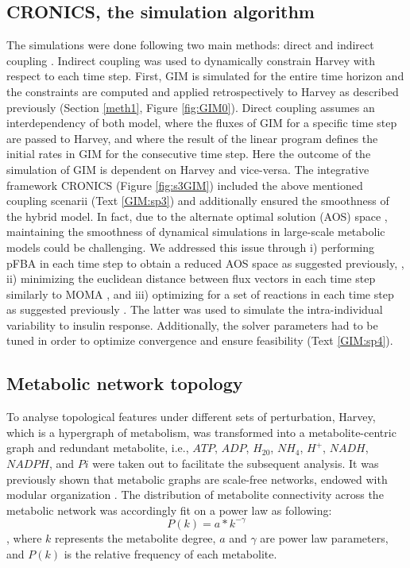 \subsection{CRONICS, the simulation algorithm}
The simulations were done following two main methods: direct and indirect coupling \cite{covert2008integrating,krauss2012integrating}. Indirect coupling was used to dynamically constrain Harvey with respect to each time step. First, GIM is simulated for the entire time horizon and the constraints are computed and applied retrospectively to Harvey as described previously (Section \ref{meth1}, Figure \ref{fig:GIM0}). Direct coupling assumes an interdependency of both model, where the fluxes of GIM for a specific time step are passed to Harvey, and where the result of the linear program defines the initial rates in GIM for the consecutive time step. Here the outcome of the simulation of GIM is dependent on Harvey and vice-versa. The integrative framework CRONICS (Figure \ref{fig:s3GIM}) included the above mentioned coupling scenarii (Text \ref{GIM:sp3}) and additionally ensured the smoothness of the hybrid model. In fact, due to the alternate optimal solution (AOS) space , maintaining the smoothness of dynamical simulations in large-scale metabolic models could be challenging. We addressed this issue through i) performing pFBA in each time step to obtain a reduced AOS space as suggested previously, \cite{toroghi2016multi}, ii) minimizing the euclidean distance between flux vectors in each time step similarly to MOMA \cite{segre2002analysis}, and iii) optimizing for a set of reactions in each time step as suggested previously \cite{gomez2014dfbalab}. The latter was used to simulate the intra-individual variability to insulin response. Additionally, the solver parameters had to be tuned in order to optimize convergence and ensure feasibility (Text \ref{GIM:sp4}).
\subsection{Metabolic network topology}
To analyse topological features under different sets of perturbation, Harvey, which is a hypergraph of metabolism, was transformed into a metabolite-centric graph and redundant metabolite, i.e., $ATP$, $ADP$, $H_20$, $NH_4$, $H^+$, $NADH$, $NADPH$, and $Pi$ were taken out to facilitate the subsequent analysis. It was previously shown that metabolic graphs are scale-free networks, endowed with modular organization \cite{jeong2000large}. The distribution of metabolite connectivity across the metabolic network was accordingly fit on a power law as following:
\begin{equation*}
P(k)=a*k^{-\gamma}
\end{equation*}
, where $k$ represents the metabolite degree, $a$ and $\gamma$ are power law parameters, and $P(k)$ is the relative frequency of each metabolite. 
